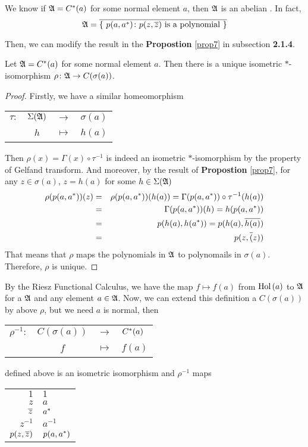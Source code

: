 \documentclass[a4paper,11pt]{report}
\begin{document}
We know if $\mathfrak{A} = C^{*}(a)$ for some normal element $a$, then $\mathfrak{A}$ is an abelian \Cs. In fact, 
\begin{equation*}
	\mathfrak{A} = \overline{\{~p(a,a^{*}) \colon p(z,\overline{z}) \text{ is a polynomial} ~\}}
\end{equation*}

Then, we can modify the result in the \textbf{Propostion} \ref{prop7} in subsection \textbf{2.1.4}.

\begin{thm}
	Let $\mathfrak{A} = C^{*}(a)$ for some normal element $a$. Then there is a unique isometric $*$-isomorphism $\rho \colon \mathfrak{A} \rightarrow C(\sigma(a))$.
\end{thm}
\begin{proof}
	Firstly, we have a similar homeomorphism
	\begin{center}
		\begin{tabular}{l c c l}
			$\tau \colon$ & $\Sigma(\mathfrak{A})$ & $\longrightarrow$ & $\sigma(a)$ \\
			~ & $h$ & $\longmapsto$ & $h(a)$
		\end{tabular}
	\end{center}
	Then $\rho(x) = \Gamma(x) \circ \tau^{-1}$ is indeed an isometric $*$-isomorphism by the property of Gelfand transform. And moreover, by the result of \textbf{Propostion} \ref{prop7}, for any $z \in \sigma(a)$, $z = h(a)$ for some $h \in \Sigma(\mathfrak{A})$
	\begin{eqnarray*}
		\rho(p(a,a^{*}))(z) &=& \rho(p(a,a^{*}))(h(a)) = \Gamma(p(a,a^{*})) \circ \tau^{-1} (h(a)) \\
		&=& \Gamma(p(a,a^{*}))(h) = h(p(a,a^{*})) \\
		&=& p(h(a), h(a^{*})) = p(h(a), \overline{h(a)}) \\
		&=& p(z,\overline{(}z))
	\end{eqnarray*}
	That means that $\rho$ maps the polynomials in $\mathfrak{A}$ to polynomails in $\sigma(a)$. Therefore, $\rho$ is unique.
\end{proof}

By the Riesz Functional Calculus, we have the map $f \mapsto f(a)$ from $\operatorname{Hol}{(a)}$ to $\mathfrak{A}$ for a \Cs $\mathfrak{A}$ and any element $a \in \mathfrak{A}$. Now, we can extend this definition a $C(\sigma(a))$ by above $\rho$, but we need $a$ is normal, then
\begin{center}
	\begin{tabular}{l c c l}
		$\rho^{-1} \colon$ & $C(\sigma(a))$ & $\longrightarrow$ & $C^{*}(a)$ \\
		~ & $f$ & $\longmapsto$ & $f(a)$
	\end{tabular}
\end{center}
defined above is an isometric isomorphism and $\rho^{-1}$ maps
\begin{center}
	\begin{tabular}{r @{$~\longmapsto$~} l}
		$1$ & $1$ \\
		$z$ & $a$ \\
		$\overline{z}$ & $a^{*}$ \\
		$z^{-1}$ & $a^{-1}$\\
		$p(z,\overline{z})$ & $p(a,a^{*})$ 
	\end{tabular}
\end{center}
\end{document}
